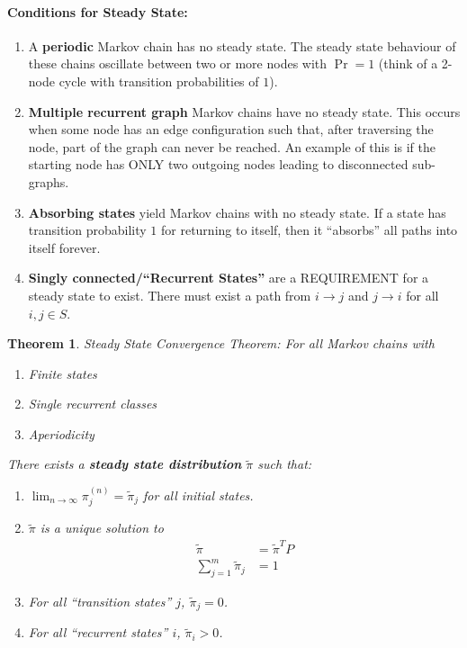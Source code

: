 \documentclass[a4paper,12pt]{report}
\newtheorem{theorem}{Theorem}
\begin{document}
\paragraph{Conditions for Steady State: } 
\begin{enumerate}
\item A \textbf{periodic} Markov chain has no steady state. The steady state behaviour of these chains oscillate between two or more nodes with $\Pr = 1$ (think of a 2-node cycle with transition probabilities of $1$).
\item \textbf{Multiple recurrent graph} Markov chains have no steady state. This occurs when some node has an edge configuration such that, after traversing the node, part of the graph can never be reached. An example of this is if the starting node has ONLY two outgoing nodes leading to disconnected sub-graphs. 
\item \textbf{Absorbing states} yield Markov chains with no steady state. If a state has transition probability $1$ for returning to itself, then it ``absorbs'' all paths into itself forever. 
\item \textbf{Singly connected/``Recurrent States''} are a REQUIREMENT for a steady state to exist. There must exist a path from $i\to j$ and $j\to i$ for all $i,j\in S$.
\end{enumerate}

\begin{theorem}{Steady State Convergence Theorem: }
For all Markov chains with 
\begin{enumerate}
\item Finite states
\item Single recurrent classes
\item Aperiodicity
\end{enumerate}

There exists a \textbf{steady state distribution} $\tilde \pi$ such that:
\begin{enumerate}
\item $\lim_{n\to \infty} \pi_j^{(n)} = \tilde \pi_j$ for all initial states.

\item $\tilde \pi$ is a unique solution to
\begin{equation}
\begin{split}
\tilde\pi &= \tilde\pi^T P \\
\sum_{j=1}^{m} \tilde\pi_j &= 1
\end{split}
\end{equation}

\item For all ``transition states'' $j$, $\tilde\pi_j = 0$.
\item For all ``recurrent states'' $i$, $\tilde\pi_i > 0$.
\end{enumerate}
\end{theorem}
\end{document}

